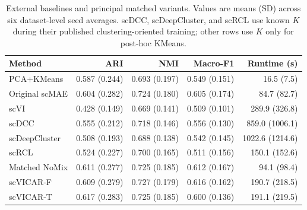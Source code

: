 \begin{table}[t]
\centering
\caption{External baselines and principal matched variants. Values are means (SD) across six dataset-level seed averages. scDCC, scDeepCluster, and scRCL use known $K$ during their published clustering-oriented training; other rows use $K$ only for post-hoc KMeans.}
\label{tab:external_baselines}
\begin{tabular}{lrrrr}
\toprule
Method & ARI & NMI & Macro-F1 & Runtime (s) \\ 
\midrule
PCA+KMeans & 0.587 (0.244) & 0.693 (0.197) & 0.549 (0.151) & 16.5 (7.5) \\
Original scMAE & 0.604 (0.282) & 0.724 (0.180) & 0.605 (0.174) & 84.7 (82.7) \\
scVI & 0.428 (0.149) & 0.669 (0.141) & 0.509 (0.101) & 289.9 (326.8) \\
scDCC & 0.555 (0.212) & 0.718 (0.146) & 0.556 (0.130) & 859.0 (1006.1) \\
scDeepCluster & 0.508 (0.193) & 0.688 (0.138) & 0.542 (0.145) & 1022.6 (1214.6) \\
scRCL & 0.524 (0.227) & 0.700 (0.165) & 0.511 (0.156) & 150.1 (152.6) \\
Matched NoMix & 0.611 (0.277) & 0.725 (0.185) & 0.612 (0.167) & 94.1 (98.4) \\
scVICAR-F & 0.609 (0.279) & 0.727 (0.179) & 0.616 (0.162) & 190.7 (218.5) \\
scVICAR-T & 0.617 (0.283) & 0.725 (0.185) & 0.600 (0.136) & 191.1 (219.5) \\
\bottomrule
\end{tabular}
\end{table}
